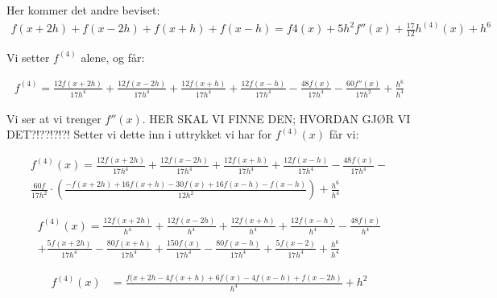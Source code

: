 Her kommer det andre beviset: 
\begin{align}
f(x+2h)+f(x-2h)+f(x+h)+f(x-h)=f4(x)+5h^2f''(x)+\frac{17}{12}h^{(4)}(x)+h^6 \nonumber
\end{align}

Vi setter $f^{(4)}$ alene, og får: 

\begin{align}
	f^{(4)}=\frac{12f(x+2h)}{17h^4}+\frac{12f(x-2h)}{17h^4}+\frac{12f(x+h)}{17h^4}+\frac{12f(x-h)}{17h^4}-\frac{48f(x)}{17h^4}-\frac{60f''(x)}{17h^2}+\frac{h^6}{h^4}
\end{align}

Vi ser at vi trenger $f''(x)$. HER SKAL VI FINNE DEN; HVORDAN GJØR VI DET?!??!?!?! 
Setter vi dette inn i uttrykket vi har for $f^{(4)}(x)$ får vi: 

\begin{multline}
    f^{(4)}(x)=\frac{12f(x+2h)}{17h^4}+\frac{12f(x-2h)}{17h^4}+\frac{12f(x+h)}{17h^4}+\frac{12f(x-h)}{17h^4}-\frac{48f(x)}{17h^4}-\\ \frac{60f}{17h^2}\cdot (\frac{-f(x+2h)+16f(x+h)-30f(x)+16f(x-h)-f(x-h)}{12h^2})+\frac{h^6}{h^4} \nonumber
\end{multline}

\begin{multline}
    f^{(4)}(x)=\frac{12f(x+2h)}{h^4}+\frac{12f(x-2h)}{h^4}+\frac{12f(x+h)}{h^4}+\frac{12f(x-h)}{h^4}-\frac{48f(x)}{h^4} \\
    +\frac{5f(x+2h)}{17h^4}-\frac{80f(x+h)}{17h^4}+\frac{150f(x)}{17h^4}-\frac{80f(x-h)}{17h^4}+\frac{5f(x-2)}{17h^4} + \frac{h^6}{h^4} \nonumber
\end{multline}

\begin{align}
    f^{(4)}(x)&=\frac{f(x+2h-4f(x+h)+6f(x)-4f(x-h)+f(x-2h)}{h^4} + h^2
\end{align}